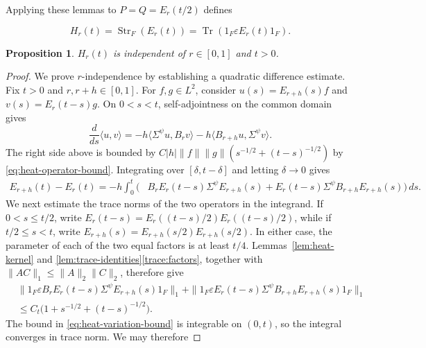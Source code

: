 \documentclass[12pt,reqno]{amsart}
\numberwithin{equation}{section}
\newtheorem{proposition}[theorem]{Proposition}
\theoremstyle{definition}
\newcommand{\Str}{\operatorname{Str}}
\newcommand{\Tr}{\operatorname{Tr}}
\begin{document}
Applying these lemmas to $P=Q=E_r(t/2)$ defines

\begin{equation}\label{eq:H-definition}
 H_r(t)=\Str_F(E_r(t))=\Tr(1_F\varepsilon E_r(t)1_F).
\end{equation}

\vspace{0.5cm}

\begin{proposition}\label{prop:heat-invariance}
$H_r(t)$ is independent of $r\in[0,1]$ and $t>0$.
\end{proposition}

\begin{proof}
We prove $r$-independence by establishing a quadratic difference
estimate. Fix $t>0$ and $r,r+h\in[0,1]$.  For $f,g\in L^2$, consider
$u(s)=E_{r+h}(s)f$ and $v(s)=E_r(t-s)g$.  On $0<s<t$,
self-adjointness on the common domain gives
\[
 \frac d{ds}\langle u,v\rangle
 =-h\langle\Sigma^\psi u,B_rv\rangle
  -h\langle B_{r+h}u,\Sigma^\psi v\rangle.
\]
The right side above is bounded by
$C|h|\|f\|\|g\|(s^{-1/2}+(t-s)^{-1/2})$ by
\eqref{eq:heat-operator-bound}.  
Integrating over $[\delta, t-\delta]$ and letting $\delta\to 0$ gives
\begin{equation}\label{eq:paired-heat-difference}
\begin{aligned}
 E_{r+h}(t)-E_r(t)=-h\int_0^t\bigl(&B_rE_r(t-s)\Sigma^\psi E_{r+h}(s)
 +E_r(t-s)\Sigma^\psi B_{r+h}E_{r+h}(s)\bigr)\,ds.
\end{aligned}
\end{equation}
We next estimate the trace norms of the two operators in the
integrand.  If $0<s\leq t/2$, write $E_r(t-s)=E_r((t-s)/2)E_r((t-s)/2)$,
while if $t/2\leq s<t$, write $E_{r+h}(s)=E_{r+h}(s/2)E_{r+h}(s/2)$.
In either case, the parameter of each of the two equal factors is at
least $t/4$.  Lemmas~\ref{lem:heat-kernel} and
\ref{lem:trace-identities}\ref{trace:factors}, together with
$\|AC\|_1\leq\|A\|_2\|C\|_2$, therefore give
\begin{equation}\label{eq:heat-variation-bound}
\begin{aligned}
 &\|1_F\varepsilon B_rE_r(t-s)\Sigma^\psi E_{r+h}(s)1_F\|_1
+
 \|1_F\varepsilon E_r(t-s)\Sigma^\psi
 B_{r+h}E_{r+h}(s)1_F\|_1\\
 &\leq
 C_t\bigl(1+s^{-1/2}+(t-s)^{-1/2}\bigr).
\end{aligned}
\end{equation}
The bound in \eqref{eq:heat-variation-bound} is integrable on
$(0,t)$, so the integral converges in trace norm.  We may therefore

\end{proof}
\end{document}
